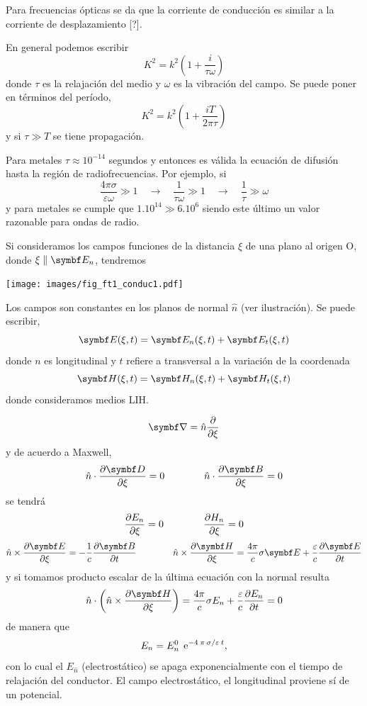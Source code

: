 \documentclass[10pt,oneside]{CBFT_book}
\begin{document}
Para frecuencias ópticas se da que la corriente de conducción es similar a la corriente de
desplazamiento [?].

En general podemos escribir
\[
	K^2 = k^2 \left( 1 + \frac{i}{\tau \omega} \right)
\]
donde $\tau$ es la relajación del medio y $\omega$ es la vibración del campo. Se puede poner en
términos del período,
\[
	K^2 = k^2 \left( 1 + \frac{iT}{ 2 \pi \tau } \right)
\]
y si $\tau \gg T$ se tiene propagación.

Para metales $\tau \approx 10^{-14}$ segundos y entonces es válida la ecuación de difusión
hasta la región de radiofrecuencias. Por ejemplo, si 
\[
	\frac{4\pi\sigma}{\varepsilon\omega} \gg 1 \quad \rightarrow \quad \frac{1}{\tau\omega} \gg 1 
			\quad \rightarrow \quad \frac{1}{\tau} \gg \omega
\]
y para metales se cumple que $1.10^{14} \gg 6.10^6$ siendo este último un valor razonable para ondas de radio.


Si consideramos los campos funciones de la distancia $\xi$ de una plano al origen O,
donde $ \xi \parallel \vb{E}_n $, 
tendremos 

	\texttt{[image: images/fig\_ft1\_conduc1.pdf]}	 

Los campos son constantes en los planos de normal $\hat{n}$ (ver ilustración).
Se puede escribir,
\[
	\vb{E}(\xi,t) = \vb{E}_n(\xi,t) + \vb{E}_t(\xi,t)
\]
donde $n$ es longitudinal y $t$ refiere a transversal a la variación de la coordenada
\[
	\vb{H}(\xi,t) = \vb{H}_n(\xi,t) + \vb{H}_t(\xi,t)
\]
donde consideramos medios LIH.

\[
	\Nabla = \hat{n} \dpar{}{\xi}
\]
y de acuerdo a Maxwell,
\[
	\hat{n} \cdot \dpar{\vb{D}}{\xi} = 0 \qquad \qquad \hat{n} \cdot \dpar{\vb{B}}{\xi} = 0
\]
se tendrá
\[
	\frac{\partial^{\hspace{-0.05em}} {E_n}}{\partial {\xi}^{\hspace{-0.05em}}} = 0  \qquad \qquad \frac{\partial^{\hspace{-0.05em}} {H_n}}{\partial {\xi}^{\hspace{-0.05em}}} = 0
\]
\[
	\hat{n} \times \dpar{\vb{E}}{\xi} = -\frac{1}{c} \dpar{\vb{B}}{t} \qquad \qquad
	\hat{n} \times \dpar{\vb{H}}{\xi} = \frac{4\pi}{c} \sigma \vb{E} + \frac{\varepsilon}{c} 
\dpar{\vb{E}}{t}
\]
y si tomamos producto escalar de la última ecuación con la normal resulta
\[
	\hat{n} \cdot \left( \hat{n} \times \dpar{\vb{H}}{\xi} \right) = 
		\frac{4\pi}{c} \sigma E_n + \frac{\varepsilon}{c} \dpar{E_n}{t} = 0 
\]
de manera que 
\[
	E_n = E_n^0 \: \:\mathrm{e}^{- 4 \: \pi \: \sigma / \varepsilon \: t },
\]
con lo cual el $E_{\hat{n}}$ (electrostático) se apaga exponencialmente con el tiempo de relajación
del conductor. 
El campo electrostático, el longitudinal proviene sí de un potencial.
\end{document}
